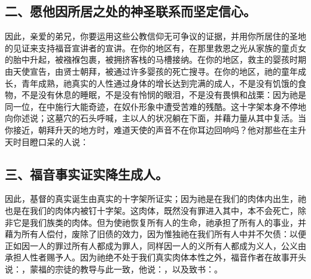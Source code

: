 
\subsection{二、愿他因所居之处的神圣联系而坚定信心。}

因此，亲爱的弟兄，你要运用这些公教信仰无可争议的证据，并用你所居住的圣地的见证来支持福音宣讲者的宣讲。在你的地区有，在那里救恩之光从家族的童贞女的胎中升起，被襁褓包裹，被拥挤客栈的马槽接纳。在你的地区，救主的婴孩时期由天使宣告，由贤士朝拜，被通过许多婴孩的死亡搜寻。在你的地区，祂的童年成长，青年成熟，祂真实的人性通过身体的增长达到完满的成人，不是没有饥饿的食物，不是没有休息的睡眠，不是没有怜悯的眼泪，不是没有畏惧和战栗：因为祂是同一位，在中施行大能奇迹，在奴仆形象中遭受苦难的残酷。这十字架本身不停地向你述说；这墓穴的石头呼喊，主以人的状况躺在下面，并藉力量从其中复活。当你接近，朝拜升天的地方时，难道天使的声音不在你耳边回响吗？他对那些在主升天时目瞪口呆的人说：\par


\subsection{三、福音事实证实降生成人。}

因此，基督的真实诞生由真实的十字架所证实；因为祂是在我们的肉体内出生，祂也是在我们的肉体内被钉十字架。这肉体，既然没有罪进入其中，本不会死亡，除非它是我们族类的肉体。但为使祂恢复所有人的生命，祂承担了所有人的事业，并藉为所有人偿付，废除了旧债的效力，因为惟独祂在我们所有人中并不欠债：以便正如因一人的罪过所有人都成为罪人，同样因一人的义所有人都成为义人，公义由承担人性者赐予人。因为祂绝不处于我们真实肉体本性之外，福音作者在故事开头说：，蒙福的宗徒的教导与此一致，他说：，以及致书：。\par


